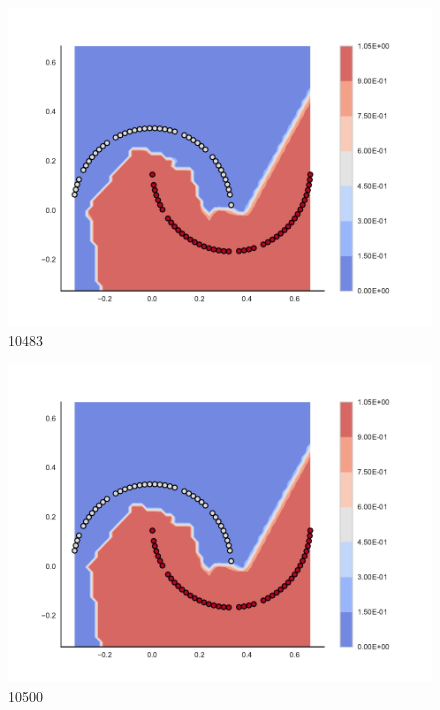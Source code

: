 \begin{subfigure}[b]{0.09\textwidth}
    \includegraphics[clip, trim=2.35cm 1.75cm 4.5cm 0cm,width=\textwidth]{img/convergence/10483.pdf}
    \caption{10483}
    \label{fig:convergence_10483}
\end{subfigure}
%
\begin{subfigure}[b]{0.09\textwidth}
    \includegraphics[clip, trim=2.35cm 1.75cm 4.5cm 0cm,width=\textwidth]{img/convergence/10500.pdf}
    \caption{10500}
    \label{fig:convergence_10500}
\end{subfigure}
%
